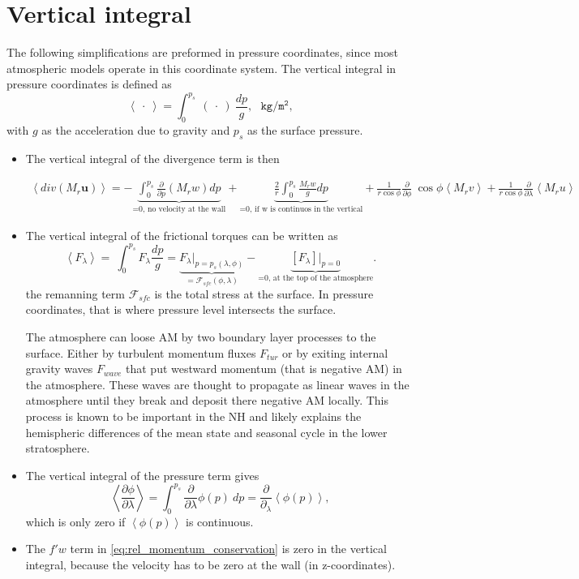 \documentclass[11pt]{article}
\numberwithin{equation}{section}
\newcommand{\beq}{\begin{equation}}
\newcommand{\eeq}{\end{equation}}
\newcommand{\la}{\langle}
\newcommand{\ra}{\rangle}
\newcommand{\vect}[1]{\boldsymbol{#1}}
\newcommand{\lara}[1]{\left\la{#1}\right\ra}
\begin{document}
\section{Vertical integral}
The following simplifications are preformed in pressure coordinates, since most atmospheric models operate in this coordinate system. The vertical integral in pressure coordinates is defined as 
\beq
\lara {~\cdot~} =  \int_0^{p_s} ~(~\cdot~)~ \frac{d p}{g},  ~~~\mathtt{kg /m^2},  
\eeq
with $g $ as the acceleration due to gravity and $p_s$ as the surface pressure.\par
\begin{itemize}
 \item The vertical integral of the divergence term is then 

\begin{align}
 \lara{div( M_r \vect u )} = - \underbrace{\int_0^{p_s}  \frac{\partial}{\partial p} ( M_r w)  dp}_\text{=0, no velocity at the wall} 
 			+  \underbrace{\frac{2}{r}  \int_0^{p_s}   \frac{M_r w}{g}  d p }_\text{=0, if w is continuos in the vertical}
			+ \frac{1}{r \cos{\phi}}  \frac{\partial}{\partial \phi}  ~\cos{\phi} \lara{M_r v } 
			+ \frac{1}{r \cos{\phi}} \frac{\partial}{\partial \lambda} \lara{M_r u}
\end{align}


\item The vertical integral of the frictional torques can be written as
\beq
\lara{F_\lambda}  = ~ \int_{0}^{p_s} F_\lambda \frac{d p}{g} = \underbrace{F_\lambda |_{p=p_s(
\lambda, \phi)}}_{= \mathcal{F}_{sfc}(\phi,\lambda)} -  \underbrace{[F_\lambda] |_{p=0}}_{\text{=0, at the top of the atmosphere}}. 
\eeq
the remanning term $\mathcal{F}_{sfc}$ is the total stress at the surface. In pressure coordinates, that is where pressure level intersects the surface.\par

The atmosphere can loose AM by two boundary layer processes to the surface. Either by turbulent momentum fluxes $F_{tur}$ or by exiting internal gravity waves $F_{wave}$ that put westward momentum (that is negative AM) in the atmosphere. These waves are thought to propagate as linear waves in the atmosphere until they break and deposit there negative AM locally. This process is known to be important in the NH and likely explains the hemispheric differences of the mean state and seasonal cycle in the lower stratosphere.


\item The vertical integral of the pressure term gives
\beq
  \lara{ \frac{\partial \phi}{\partial \lambda}  } =    \int_0^{p_s}  \frac{\partial}{\partial \lambda} \phi(p)  ~dp = \frac{\partial}{\partial_\lambda} \lara{\phi(p) }, 
\eeq
which is only zero if $\lara{\phi(p) }$ is continuous.

\item The $f' w$ term in \eqref{eq:rel_momentum_conservation} is zero in the vertical integral, because the velocity has to be zero at the wall (in z-coordinates).
\end{itemize}
\end{document}

